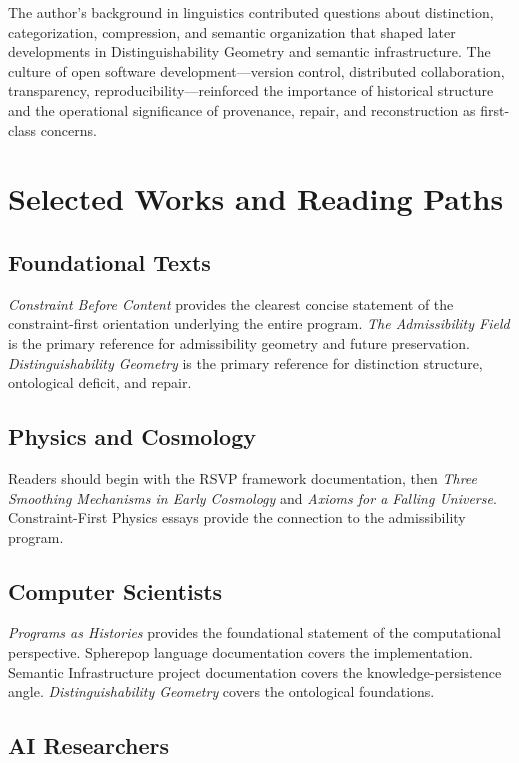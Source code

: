 \documentclass[11pt, oneside]{book}
\theoremstyle{definition}
\theoremstyle{remark}
\begin{document}
The author's background in linguistics contributed questions about distinction, categorization, compression, and semantic organization that shaped later developments in Distinguishability Geometry and semantic infrastructure. The culture of open software development—version control, distributed collaboration, transparency, reproducibility—reinforced the importance of historical structure and the operational significance of provenance, repair, and reconstruction as first-class concerns.

\chapter{Selected Works and Reading Paths}

\section*{Foundational Texts}

\textit{Constraint Before Content} provides the clearest concise statement of the constraint-first orientation underlying the entire program. \textit{The Admissibility Field} is the primary reference for admissibility geometry and future preservation. \textit{Distinguishability Geometry} is the primary reference for distinction structure, ontological deficit, and repair.

\section*{Physics and Cosmology}

Readers should begin with the RSVP framework documentation, then \textit{Three Smoothing Mechanisms in Early Cosmology} and \textit{Axioms for a Falling Universe}. Constraint-First Physics essays provide the connection to the admissibility program.

\section*{Computer Scientists}

\textit{Programs as Histories} provides the foundational statement of the computational perspective. Spherepop language documentation covers the implementation. Semantic Infrastructure project documentation covers the knowledge-persistence angle. \textit{Distinguishability Geometry} covers the ontological foundations.

\section*{AI Researchers}
\end{document}

